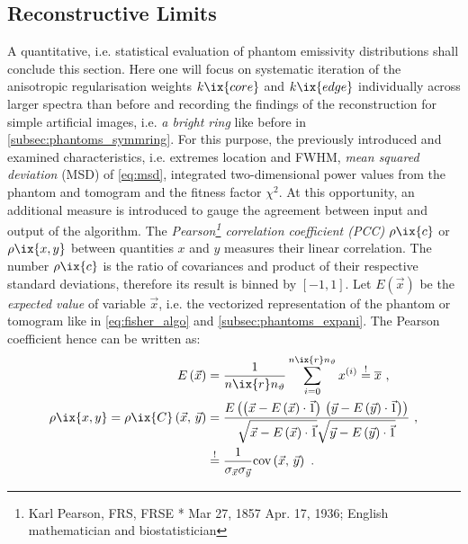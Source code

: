         \subsection{Reconstructive Limits}\label{subsec:limits}%
%
            A quantitative, i.e. statistical evaluation of phantom emissivity distributions shall conclude this section. Here one will focus on systematic iteration of the anisotropic regularisation weights $k\ix{core}$ and $k\ix{edge}$ individually across larger spectra than before and recording the findings of the reconstruction for simple artificial images, i.e. \textit{a bright ring} like before in \cref{subsec:phantoms_symmring}. For this purpose, the previously introduced and examined characteristics, i.e. extremes location and FWHM, \textit{mean squared deviation} (MSD) of \cref{eq:msd}, integrated two-dimensional power values from the phantom and tomogram and the fitness factor $\chi^{2}$. At this opportunity, an additional measure is introduced to gauge the agreement between input and output of the algorithm. The \textit{Pearson\footnote[1]{Karl Pearson, FRS, FRSE * Mar 27, 1857 \textdagger Apr. 17, 1936; English mathematician and biostatistician} correlation coefficient (PCC)} $\rho\ix{c}$ or $\rho\ix{x,y}$ between quantities $x$ and $y$ measures their linear correlation. The number $\rho\ix{c}$ is the ratio of covariances and product of their respective standard deviations, therefore its result is binned by $\left[-1, 1\right]$. Let $E\left(\vec{x}\right)$ be the \textit{expected value} of variable $\vec{x}$, i.e. the vectorized representation of the phantom or tomogram like in \cref{eq:fisher_algo} and \cref{subsec:phantoms_expani}. The Pearson coefficient hence can be written as:%
%
            \begin{align}%
                \begin{split}\label{eq:pearson}%
                    E\left(\vec{x}\right)&=\frac{1}{n\ix{r}n_{\vartheta}}\displaystyle\sum_{i=0}^{n\ix{r}n_{\vartheta}}x^{\left(i\right)}\overset{!}{=}\overline{x}\,\,,\\%
                    \rho\ix{x,y}=\rho\ix{C}\left(\vec{x},\,\vec{y}\right)&=\frac{E\left(\left(\vec{x}-E\left(\vec{x}\right)\cdot\vec{1}\right)\,\left(\vec{y}-E\left(\vec{y}\right)\cdot\vec{1}\right)\right)}{\sqrt{\vec{x}-E\left(\vec{x}\right)\cdot\vec{1}}\sqrt{\vec{y}-E\left(\vec{y}\right)\cdot\vec{1}}}\,\,,\\
                    &\overset{!}{=}\frac{1}{\sigma_{\vec{x}}\sigma_{\vec{y}}}\text{cov}\left(\vec{x},\,\vec{y}\right)\,\,.%
                \end{split}%
            \end{align}%
%
